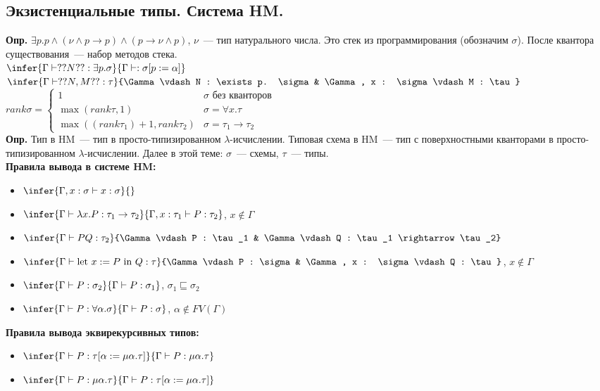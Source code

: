 \documentclass[12pt]{article}
\begin{document}
	\subsection{Экзистенциальные типы. Система HM.}
	\textbf{Опр.} $\exists p. p \wedge (\nu \wedge p \rightarrow p) \wedge (p \rightarrow \nu \wedge p)$, $\nu$~--- тип натурального числа. Это стек из программирования (обозначим $\sigma$). После квантора существования~--- набор методов стека. \\
	$\infer{\Gamma \vdash ?? N ?? : \exists p. \sigma}{\Gamma \vdash : \sigma [p := \alpha]}$ \\
	$\infer{\Gamma \vdash ?? N, M ??: \tau}{\Gamma \vdash N : \exists p. \sigma & \Gamma, x : \sigma \vdash M : \tau}$ \\
	$rank \sigma =
	\begin{cases}
		1 & \sigma \text{ без кванторов} \\
		\max(rank \tau, 1) & \sigma = \forall x. \tau \\
		\max((rank \tau_1) + 1, rank \tau_2) & \sigma = \tau_1 \rightarrow \tau_2
	\end{cases}
	$ \\
	\textbf{Опр.} Тип в HM~--- тип в просто-типизированном $\lambda$-исчислении. Типовая схема в HM~--- тип с поверхностными кванторами в просто-типизированном $\lambda$-исчислении. Далее в этой теме: $\sigma$~--- схемы, $\tau$~--- типы. \\
	\textbf{Правила вывода в системе HM:}
	\begin{itemize}
		\item $\infer{\Gamma, x : \sigma \vdash x : \sigma}{}$
		\item $\infer{\Gamma \vdash \lambda x. P : \tau_1 \rightarrow \tau_2}{\Gamma, x : \tau_1 \vdash P : \tau_2}$, $x \not\in \Gamma$
		\item $\infer{\Gamma \vdash PQ : \tau_2}{\Gamma \vdash P : \tau_1 & \Gamma \vdash Q : \tau_1 \rightarrow \tau_2}$
		\item $\infer{\Gamma \vdash \text{let } x := P \text{ in } Q : \tau}{\Gamma \vdash P : \sigma & \Gamma, x : \sigma \vdash Q : \tau}$, $x \not\in \Gamma$
		\item $\infer{\Gamma \vdash P : \sigma_2}{\Gamma \vdash P : \sigma_1}$, $\sigma_1 \sqsubseteq \sigma_2$
		\item $\infer{\Gamma \vdash P : \forall \alpha. \sigma}{\Gamma \vdash P : \sigma}$, $\alpha \not\in FV(\Gamma)$
	\end{itemize}
	\textbf{Правила вывода эквирекурсивных типов:}
	\begin{itemize}
		\item $\infer{\Gamma \vdash P : \tau [\alpha := \mu \alpha. \tau]}{\Gamma \vdash P : \mu \alpha. \tau}$
		\item $\infer{\Gamma \vdash P : \mu \alpha. \tau}{\Gamma \vdash P : \tau [\alpha := \mu \alpha. \tau]}$
	\end{itemize}
\end{document}
